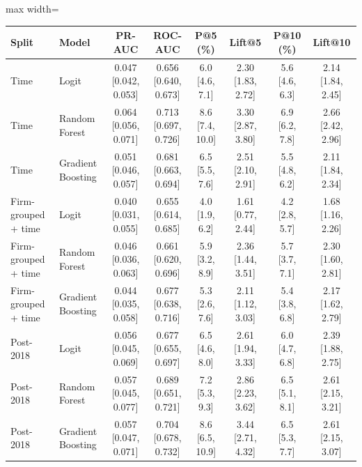 \begin{table}[!htbp]
 \label{tab:model_performance_v2}
\centering
\scriptsize
\setlength{\tabcolsep}{2.5pt}
\renewcommand{\arraystretch}{1.10}
\begin{adjustbox}{max width=\textwidth}
\begin{tabular}{llcccccc}
\hline
Split & Model & PR-AUC & ROC-AUC & P@5 (\%) & Lift@5 & P@10 (\%) & Lift@10 \\
\hline
Time & Logit & 0.047 [0.042, 0.053] & 0.656 [0.640, 0.673] & 6.0 [4.6, 7.1] & 2.30 [1.83, 2.72] & 5.6 [4.6, 6.3] & 2.14 [1.84, 2.45] \\
Time & Random Forest & 0.064 [0.056, 0.071] & 0.713 [0.697, 0.726] & 8.6 [7.4, 10.0] & 3.30 [2.87, 3.80] & 6.9 [6.2, 7.8] & 2.66 [2.42, 2.96] \\
Time & Gradient Boosting & 0.051 [0.046, 0.057] & 0.681 [0.663, 0.694] & 6.5 [5.5, 7.6] & 2.51 [2.10, 2.91] & 5.5 [4.8, 6.2] & 2.11 [1.84, 2.34] \\
Firm-grouped + time & Logit & 0.040 [0.031, 0.055] & 0.655 [0.614, 0.685] & 4.0 [1.9, 6.2] & 1.61 [0.77, 2.44] & 4.2 [2.8, 5.7] & 1.68 [1.16, 2.26] \\
Firm-grouped + time & Random Forest & 0.046 [0.036, 0.063] & 0.661 [0.620, 0.696] & 5.9 [3.2, 8.9] & 2.36 [1.44, 3.51] & 5.7 [3.7, 7.1] & 2.30 [1.60, 2.81] \\
Firm-grouped + time & Gradient Boosting & 0.044 [0.035, 0.058] & 0.677 [0.638, 0.716] & 5.3 [2.6, 7.6] & 2.11 [1.12, 3.03] & 5.4 [3.8, 6.8] & 2.17 [1.62, 2.79] \\
Post-2018 & Logit & 0.056 [0.045, 0.069] & 0.677 [0.655, 0.697] & 6.5 [4.6, 8.0] & 2.61 [1.94, 3.33] & 6.0 [4.7, 6.8] & 2.39 [1.88, 2.75] \\
Post-2018 & Random Forest & 0.057 [0.045, 0.077] & 0.689 [0.651, 0.721] & 7.2 [5.3, 9.3] & 2.86 [2.23, 3.62] & 6.5 [5.1, 8.1] & 2.61 [2.15, 3.21] \\
Post-2018 & Gradient Boosting & 0.057 [0.047, 0.071] & 0.704 [0.678, 0.732] & 8.6 [6.5, 10.9] & 3.44 [2.71, 4.32] & 6.5 [5.3, 7.7] & 2.61 [2.15, 3.07] \\
\hline
\end{tabular}
\end{adjustbox}
\end{table}